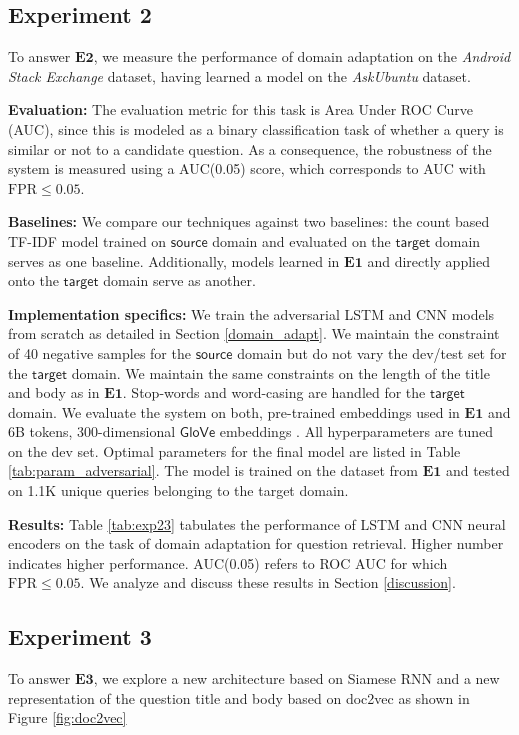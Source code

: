 \documentclass{sigkddExp}
\begin{document}
\subsection{Experiment 2} 
To answer $\mathbf{E2}$, we measure the performance of domain adaptation on the \textit{Android Stack Exchange} dataset, having learned a model on the \textit{AskUbuntu} dataset.

\textbf{Evaluation:} The evaluation metric for this task is Area Under ROC Curve (AUC), since this is modeled as a binary classification task of whether a query is similar or not to a candidate question. As a consequence, the robustness of the system is measured using a AUC(0.05) score, which corresponds to AUC with $\mathrm{FPR} \leq 0.05$.

\textbf{Baselines:} We compare our techniques against two baselines: the count based TF-IDF model trained on $\textsf{source}$ domain and evaluated on the $\textsf{target}$ domain serves as one baseline. Additionally, models learned in $\mathbf{E1}$ and directly applied onto the $\textsf{target}$ domain serve as another.

\textbf{Implementation specifics:} We train the adversarial LSTM and CNN models from scratch as detailed in Section \ref{domain_adapt}. We maintain the constraint of 40 negative samples for the $\mathsf{source}$ domain but do not vary the dev/test set for the $\mathsf{target}$ domain. We maintain the same constraints on the length of the title and body as in $\mathbf{E1}$. Stop-words and word-casing are handled for the $\mathsf{target}$ domain. We evaluate the system on both, pre-trained embeddings used in $\mathbf{E1}$ and 6B tokens, 300-dimensional $\mathsf{GloVe}$ embeddings \cite{pennington2014glove}. All hyperparameters are tuned on the dev set. Optimal parameters for the final model are listed in Table \ref{tab:param_adversarial}. The model is trained on the dataset from $\mathbf{E1}$ and tested on 1.1K unique queries belonging to the \textsf{target} domain.

\textbf{Results:} Table \ref{tab:exp23} tabulates the performance of LSTM and CNN neural encoders on the task of domain adaptation for question retrieval. Higher number indicates higher performance. AUC(0.05) refers to ROC AUC for which $\mathrm{FPR} \leq 0.05$. We analyze and discuss these results in Section \ref{discussion}.

\subsection{Experiment 3}
To answer $\mathbf{E3}$, we explore a new architecture based on Siamese RNN and a new representation of the question title and body based on \textsf{doc2vec} as shown in Figure \ref{fig:doc2vec}
\end{document}
